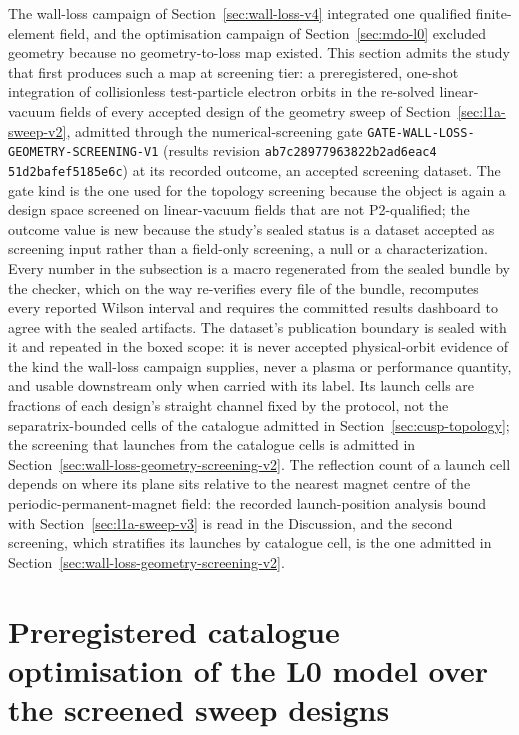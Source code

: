 \documentclass[11pt]{article}
\newcommand{\GeometryScreeningEvidenceRevision}{\texttt{ab7c2897\allowbreak{}7963822b\allowbreak{}2ad6eac4\allowbreak{}%
51d2bafe\allowbreak{}f5185e6c}}
\begin{document}
The wall-loss campaign of Section~\ref{sec:wall-loss-v4} integrated one
qualified finite-element field, and the optimisation campaign of
Section~\ref{sec:mdo-l0} excluded geometry because no geometry-to-loss map
existed. This section admits the study that first produces such a map at
screening tier: a preregistered, one-shot integration of collisionless
test-particle electron orbits in the re-solved linear-vacuum fields of every
accepted design of the geometry sweep of Section~\ref{sec:l1a-sweep-v2}, admitted
through the numerical-screening gate
\texttt{GATE-WALL-LOSS-GEOMETRY-SCREENING-V1} (results revision
\GeometryScreeningEvidenceRevision) at its recorded outcome, an accepted
screening dataset. The gate kind is the one used for the topology screening
because the object is again a design space screened on linear-vacuum fields
that are not P2-qualified; the outcome value is new because the study's sealed
status is a dataset accepted as screening input rather than a field-only
screening, a null or a characterization. Every number in the subsection is a
macro regenerated from the sealed bundle by the checker, which on the way
re-verifies every file of the bundle, recomputes every reported Wilson
interval and requires the committed results dashboard to agree with the sealed
artifacts. The dataset's publication boundary is sealed with it and repeated in
the boxed scope: it is never accepted physical-orbit evidence of the kind the
wall-loss campaign supplies, never a plasma or performance quantity, and usable
downstream only when carried with its label. Its launch cells are fractions of
each design's straight channel fixed by the protocol, not the separatrix-bounded
cells of the catalogue admitted in Section~\ref{sec:cusp-topology}; the screening
that launches from the catalogue cells is admitted in
Section~\ref{sec:wall-loss-geometry-screening-v2}. The reflection count of a launch
cell depends on where its plane sits relative to the nearest magnet centre of the
periodic-permanent-magnet field: the recorded launch-position analysis bound with
Section~\ref{sec:l1a-sweep-v3} is read in the Discussion, and the second screening,
which stratifies its launches by catalogue cell, is the one admitted in
Section~\ref{sec:wall-loss-geometry-screening-v2}.



\section{Preregistered catalogue optimisation of the L0 model over the screened sweep designs}
\label{sec:mdo-l0-v2}
\end{document}
